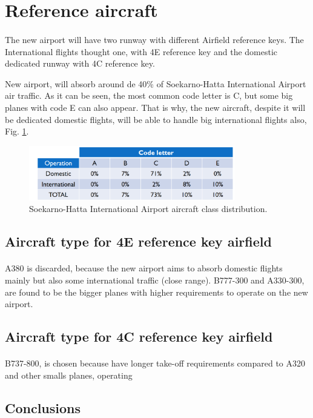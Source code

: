 \section{Reference aircraft}
\paragraph{} The new airport will have two runway with different Airfield reference keys. The International flights thought one, with 4E reference key and the domestic dedicated runway with 4C reference key.

New airport, will absorb around de 40\% of Soekarno-Hatta International Airport air traffic. As it can be seen, the most common code letter is C, but some big planes with code E can also appear. That is why, the new aircraft, despite it will be dedicated domestic flights, will be able to handle big international flights also, Fig. \ref{aircraftDist}.
\begin{figure}[H]
	\centering
	\includegraphics[clip, trim=0.1cm 0.1cm 0.1cm 0.1cm, width=0.8\textwidth]{./images/PROGNOSIS/aircraft/aircraftDist}
	\caption{Soekarno-Hatta International Airport aircraft class distribution.}
	\label{aircraftDist}
\end{figure}

	\subsection{Aircraft type for 4E reference key airfield}
	\paragraph{} A380 is discarded, because the new airport aims to absorb domestic flights mainly but also some international traffic (close range). B777-300 and A330-300, are found to be the bigger planes with higher requirements to operate on the new airport. 
	
	\subsection{Aircraft type for 4C reference key airfield}
	\paragraph{} B737-800, is chosen because have longer take-off requirements compared to A320 and other smalls planes, operating 
	
	\subsection{Conclusions}